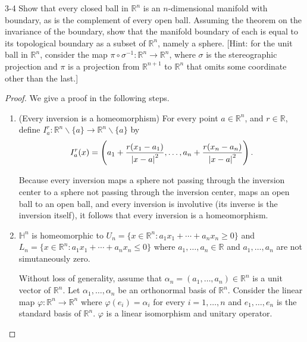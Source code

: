 \begin{problem}{3-4}
Show that every closed ball in $\mathbb{R}^{n}$ is an $n$-dimensional manifold with boundary, as is the complement of every open ball. Assuming the theorem on the invariance of the boundary, show that the manifold boundary of each is equal to its topological boundary as a subset of $\mathbb{R}^{n}$, namely a sphere. [Hint: for the unit ball in $\mathbb{R}^{n}$, consider the map $\pi\circ\sigma^{-1}: \mathbb{R}^{n}\to\mathbb{R}^{n}$, where $\sigma$ is the stereographic projection and $\pi$ is a projection from $\mathbb{R}^{n+1}$ to $\mathbb{R}^{n}$ that omits some coordinate other than the last.]
\end{problem}

\begin{proof}
    We give a proof in the following steps.
    \begin{enumerate}[label={\textbf{Step \arabic*.}},itemindent=1cm]
        \item (Every inversion is a homeomorphism) For every point $a\in\mathbb{R}^{n}$, and $r\in\mathbb{R}$, define $I^{r}_{a}: \mathbb{R}^{n}\smallsetminus\{ a \} \to \mathbb{R}^{n}\smallsetminus\{ a \}$ by
              \[
                  I^{r}_{a}(x) = \left(a_{1} + \frac{r(x_{1} - a_{1})}{\left\vert{x - a}\right\vert^{2}}, \ldots, a_{n} + \frac{r(x_{n} - a_{n})}{\left\vert{x-a}\right\vert^{2}}\right).
              \]

              Because every inversion maps a sphere not passing through the inversion center to a sphere not passing through the inversion center, maps an open ball to an open ball, and every inversion is involutive (its inverse is the inversion itself), it follows that every inversion is a homeomorphism.
        \item $\mathbb{H}^{n}$ is homeomorphic to $U_{n} = \{ x\in\mathbb{R}^{n} : a_{1}x_{1} + \cdots + a_{n}x_{n} \geq 0 \}$ and $L_{n} = \{ x\in\mathbb{R}^{n} : a_{1}x_{1} + \cdots + a_{n}x_{n} \leq 0 \}$ where $a_{1}, \ldots, a_{n}\in\mathbb{R}$ and $a_{1}, \ldots, a_{n}$ are not simutaneously zero.

              Without loss of generality, assume that $\alpha_{n} = (a_{1}, \ldots, a_{n})\in\mathbb{R}^{n}$ is a unit vector of $\mathbb{R}^{n}$. Let $\alpha_{1}, \ldots, \alpha_{n}$ be an orthonormal basis of $\mathbb{R}^{n}$. Consider the linear map $\varphi: \mathbb{R}^{n}\to \mathbb{R}^{n}$ where $\varphi(e_{i}) = \alpha_{i}$ for every $i = 1,\ldots, n$ and $e_{1}, \ldots, e_{n}$ is the standard basis of $\mathbb{R}^{n}$. $\varphi$ is a linear isomorphism and unitary operator.


\end{enumerate}
\end{proof}

